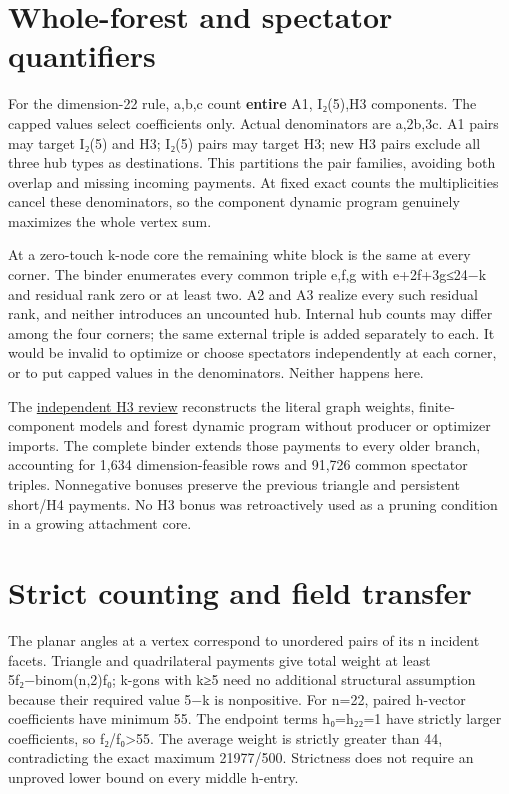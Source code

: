 \documentclass[
  10pt,
]{report}
\begin{document}
\section{Whole-forest and spectator
quantifiers}\label{whole-forest-and-spectator-quantifiers}

For the dimension-22 rule, a,b,c count \textbf{entire} A1, I₂(5),H3
components. The capped values select coefficients only. Actual
denominators are a,2b,3c. A1 pairs may target I₂(5) and H3; I₂(5) pairs
may target H3; new H3 pairs exclude all three hub types as destinations.
This partitions the pair families, avoiding both overlap and missing
incoming payments. At fixed exact counts the multiplicities cancel these
denominators, so the component dynamic program genuinely maximizes the
whole vertex sum.

At a zero-touch k-node core the remaining white block is the same at
every corner. The binder enumerates every common triple e,f,g with
e+2f+3g≤24−k and residual rank zero or at least two. A2 and A3 realize
every such residual rank, and neither introduces an uncounted hub.
Internal hub counts may differ among the four corners; the same external
triple is added separately to each. It would be invalid to optimize or
choose spectators independently at each corner, or to put capped values
in the denominators. Neither happens here.

The
\href{fresh_sqrt5_dimension22_h3_cross_20261016_review.md}{independent
H3 review} reconstructs the literal graph weights, finite-component
models and forest dynamic program without producer or optimizer imports.
The complete binder extends those payments to every older branch,
accounting for 1,634 dimension-feasible rows and 91,726 common spectator
triples. Nonnegative bonuses preserve the previous triangle and
persistent short/H4 payments. No H3 bonus was retroactively used as a
pruning condition in a growing attachment core.

\section{Strict counting and field
transfer}\label{strict-counting-and-field-transfer}

The planar angles at a vertex correspond to unordered pairs of its n
incident facets. Triangle and quadrilateral payments give total weight
at least 5f₂−binom(n,2)f₀; k-gons with k≥5 need no additional structural
assumption because their required value 5−k is nonpositive. For n=22,
paired h-vector coefficients have minimum 55. The endpoint terms
h₀=h₂₂=1 have strictly larger coefficients, so f₂/f₀\textgreater55. The
average weight is strictly greater than 44, contradicting the exact
maximum 21977/500. Strictness does not require an unproved lower bound
on every middle h-entry.
\end{document}
